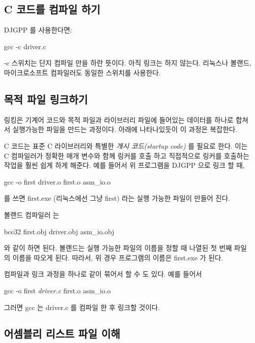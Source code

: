 \subsection{C 코드를 컴파일 하기}

DJGPP 를 사용한다면:
\begin{CodeQuote}
gcc -c driver.c
\end{CodeQuote}
{\code -c} 스위치는 단지 컴파일 만을 하란 뜻이다. 아직 링크는 하지 않는다. 리눅스나 볼랜드, 마이크로소프트 컴파일러도 동일한 스위치를 사용한다. 

\subsection{목적 파일 링크하기 \label{seq:linking} }

링킹은 기계어 코드와 목적 파일과 라이브러리 파일에 들어있는 데이터를 하나로 합쳐서 실행가능한 파일을 만드는 과정이다. 아래에 나타나있듯이 
이 과정은 복잡한다. 

C 코드는 표준 C 라이브러리와 특별한 \emph{개시 코드(startup code)} 를 필요로 한다. 이는 C 컴파일러가 정확한 매개 변수와 함께 링커를 호출
하고 직접적으로 링커를 호출하는 작업을 훨씬 쉽게 하게 해준다. 예를 들어서 위 프로그램을 DJGPP 으로 링크 할 때, 

\begin{CodeQuote}
gcc -o first driver.o first.o asm\_io.o
\end{CodeQuote}
를 쓰면 {\code first.exe} (리눅스에선 그냥 {\code first}) 라는 실행 가능한 파일이 만들어 진다. 

볼랜드 컴파일러  는 
\begin{CodeQuote}
bcc32 first.obj driver.obj asm\_io.obj
\end{CodeQuote}
와 같이 하면 된다. 볼랜드는 실행 가능한 파일의 이름을 정할 때 나열된 첫 번째 파일의 이름을 따오게 된다. 따라서, 위 경우 프로그램의 이름은 {\code first.exe} 
가 된다. 

컴파일과 링크 과정을 하나로 같이 묶어서 할 수 도 있다. 예를 들어서 
\begin{CodeQuote}
gcc -o first {\em driver.c} first.o asm\_io.o
\end{CodeQuote}
그러면 {\code gcc} 는 {\code driver.c} 를 컴파일 한 후 링크할 것이다. 

\subsection{어셈블리 리스트 파일 이해 }


